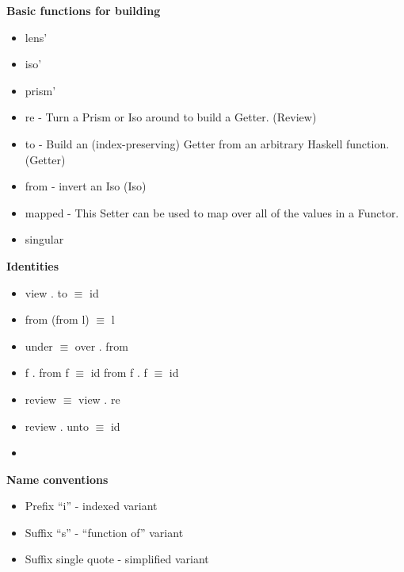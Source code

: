 \documentclass[a4paper]{article}
\newcommand\liststyleWWNumi{%
\renewcommand\labelitemi{${\bullet}$}
\renewcommand\labelitemii{${\circ}$}
\renewcommand\labelitemiii{${\blacksquare}$}
\renewcommand\labelitemiv{${\bullet}$}
}
\newcommand\liststyleWWNumii{%
\renewcommand\labelitemi{${\bullet}$}
\renewcommand\labelitemii{${\circ}$}
\renewcommand\labelitemiii{${\blacksquare}$}
\renewcommand\labelitemiv{${\bullet}$}
}
\newcommand\liststyleWWNumiv{%
\renewcommand\labelitemi{${\bullet}$}
\renewcommand\labelitemii{${\circ}$}
\renewcommand\labelitemiii{${\blacksquare}$}
\renewcommand\labelitemiv{${\bullet}$}
}
\begin{document}
\bigskip

\textbf{Basic functions for building}


\bigskip

\liststyleWWNumi
\begin{itemize}
\item lens{\textquoteright}
\item iso{\textquoteright}
\item prism{\textquoteright}
\item re - Turn a Prism or Iso around to build a Getter. (Review)
\item to - Build an (index-preserving) Getter from an arbitrary Haskell
function. (Getter)
\item from - invert an Iso (Iso)
\item mapped - This Setter can be used to map over all of the values in
a Functor.
\item singular
\end{itemize}

\bigskip

\textbf{Identities}

\bigskip

\liststyleWWNumii
\begin{itemize}
\item view . to ${\equiv}$ id
\item from (from l) ${\equiv}$ l
\item under ${\equiv}$ over . from
\item f . from f ${\equiv}$ id\newline
from f . f ${\equiv}$ id
\item review ${\equiv}$ view . re
\item review . unto ${\equiv}$ id
\item 
\bigskip
\end{itemize}

\bigskip

\textbf{Name conventions}


\bigskip

\liststyleWWNumiv
\begin{itemize}
\item Prefix {\textquotedblleft}i{\textquotedblright} - indexed variant
\item Suffix {\textquotedblleft}s{\textquotedblright} -
{\textquotedblleft}function of{\textquotedblright} variant
\item Suffix single quote - simplified variant
\end{itemize}
\end{document}
